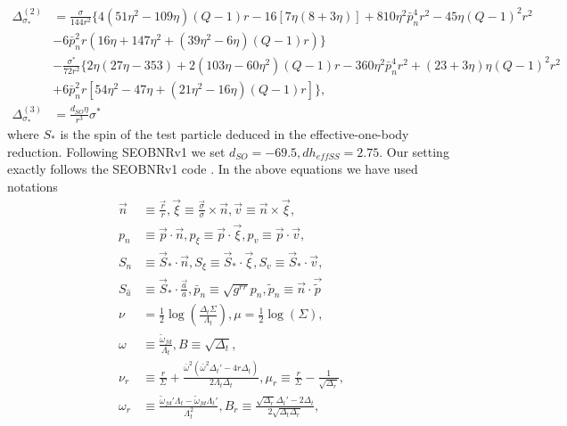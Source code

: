 \documentclass[prd,aps,a4paper,superscriptaddress,twocolumn,footinbib,showpacs]{revtex4}
\begin{document}
\begin{widetext}
\begin{align}
\Delta^{(2)}_{\sigma_*}&=\frac{\sigma}{144r^2}\{4(51\eta^2-109\eta)(Q-1)r
-16[7\eta(8+3\eta)]+810\eta^2\bar{p}_n^4r^2-45\eta(Q-1)^2r^2\nonumber\\
&-6\bar{p}_n^2r(16\eta+147\eta^2+(39\eta^2-6\eta)(Q-1)r)\}\nonumber\\
&-\frac{\sigma^*}{72r^2}\{2\eta(27\eta-353)+2(103\eta-60\eta^2)(Q-1)r
-360\eta^2\bar{p}_n^4r^2+(23+3\eta)\eta(Q-1)^2r^2\nonumber\\
&+6\bar{p}_n^2r[54\eta^2-47\eta+(21\eta^2-16\eta)(Q-1)r]\},\\
\Delta^{(3)}_{\sigma_*}&=\frac{d_{SO}\eta}{r^3}\sigma^*
\end{align}
where $S_*$ is the spin of the test particle deduced in the effective-one-body reduction. Following SEOBNRv1 we set $d_{SO}=-69.5, dh_{effSS}=2.75$. Our setting exactly follows the SEOBNRv1 code \cite{SEOBNRv1code}. In the above equations we have used notations
\begin{align}
\vec{n}&\equiv\frac{\vec{r}}{r},\vec{\xi}\equiv\frac{\vec{\sigma}}{\sigma}\times \vec{n},\vec{v}\equiv \vec{n}\times\vec{\xi},\label{xi26}\\
p_n&\equiv \vec{p}\cdot\vec{n}, p_\xi\equiv \vec{p}\cdot\vec{\xi}, p_v\equiv \vec{p}\cdot\vec{v},\\
S_n&\equiv \vec{S}_*\cdot\vec{n}, S_\xi\equiv \vec{S}_*\cdot\vec{\xi}, S_v\equiv \vec{S}_*\cdot\vec{v},\\
S_{\hat{a}}&\equiv \vec{S}_*\cdot\frac{\vec{a}}{a},
\bar{p}_n\equiv\sqrt{g^{rr}}p_n,\tilde{p}_n\equiv\vec{n}\cdot\vec{\tilde{p}}\\
\nu&=\frac{1}{2}\log(\frac{\Delta_t\Sigma}{\Lambda_t}),\mu=\frac{1}{2}\log(\Sigma),\\
\omega&\equiv\frac{\tilde{\omega}_{fd}}{\Lambda_t},B\equiv\sqrt{\Delta_t},\\
\nu_r&\equiv\frac{r}{\Sigma}+\frac{\bar{\omega}^2(\bar{\omega}^2\Delta_t'-4r\Delta_t)}{2\Lambda_t\Delta_t},
\mu_r\equiv\frac{r}{\Sigma}-\frac{1}{\sqrt{\Delta_r}},\\
\omega_r&\equiv\frac{\tilde{\omega}_{fd}'\Lambda_t-\tilde{\omega}_{fd}\Lambda_t'}{\Lambda_t^2},
B_r\equiv\frac{\sqrt{\Delta_r}\Delta_t'-2\Delta_t}{2\sqrt{\Delta_t\Delta_r}},\\

\end{align}
\end{widetext}
\end{document}

